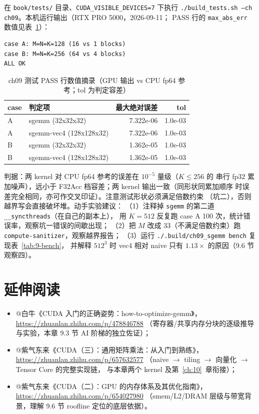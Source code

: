在 \texttt{book/tests/} 目录、\texttt{CUDA\_\allowbreak{}VISIBLE\_\allowbreak{}DEVICES=\allowbreak{}7} 下执行
\texttt{.\allowbreak{}/\allowbreak{}build\_\allowbreak{}tests.\allowbreak{}sh --ch ch09}。本机运行输出（RTX PRO 5000，2026-09-11；
PASS 行的 \texttt{max\_abs\_err} 数值见表~\ref{tab:9-pass}）：

\begin{lstlisting}[style=console]
case A: M=N=K=128 (16 vs 1 blocks)
case B: M=N=K=256 (64 vs 4 blocks)
ALL OK
\end{lstlisting}

\begin{table}[htbp]
\centering
\caption{ch09 测试 PASS 行数值摘录（GPU 输出 vs CPU fp64 参考；tol 为判定容差）}
\label{tab:9-pass}
\begin{tabular}{llrr}
\toprule
case & 判定项 & 最大绝对误差 & tol \\
\midrule
A & sgemm (32x32x32)      & 7.322e-06 & 1.0e-03 \\
A & sgemm-vec4 (128x128x32) & 7.322e-06 & 1.0e-03 \\
B & sgemm (32x32x32)      & 1.362e-05 & 1.0e-03 \\
B & sgemm-vec4 (128x128x32) & 1.362e-05 & 1.0e-03 \\
\bottomrule
\end{tabular}
\end{table}

判据：两 kernel 对 CPU fp64 参考的误差在 $10^{-5}$ 量级（$K \le 256$ 的
串行 fp32 累加噪声），远小于 F32Acc 档容差；两 kernel 输出一致（同形状同累加顺序
时误差完全相同，亦可作交叉印证）。注意测试形状必须满足倍数约束
（坑二），否则越界写会直接破坏堆。动手实验建议：
（1）注释掉 \texttt{sgemm} 的第二道 \texttt{\_\allowbreak{}\_\allowbreak{}syncthreads}（在自己的副本上），
用 $K = 512$ 反复跑 case A 100 次，统计错误率，观察坑一错误的间歇出现；
（2）把 $M$ 改成 33（不满足倍数约束）跑 \texttt{compute-sanitizer}，观察越界报告；
（3）运行 \texttt{.\allowbreak{}/\allowbreak{}.\allowbreak{}build/\allowbreak{}ch09\_\allowbreak{}sgemm bench} 复现表~\ref{tab:9-bench}，
并解释 $512^3$ 时 vec4 相对 naive 只有 $1.13\times$ 的原因（9.6 节观察四）。

\section*{延伸阅读}

\begin{itemize}
  \item @白牛《CUDA 入门的正确姿势：how-to-optimize-gemm》，
        \url{https://zhuanlan.zhihu.com/p/478846788}
        （寄存器/共享内存分块的逐级推导与实验，本章 9.3 节 AI 阶梯的独立佐证）；
  \item @紫气东来《CUDA（三）：通用矩阵乘法：从入门到熟练》，
        \url{https://zhuanlan.zhihu.com/p/657632577}
        （naive $\to$ tiling $\to$ 向量化 $\to$ Tensor Core 的完整实现链，
        与本章两个 kernel 及第~\ref{ch:10}~章衔接）；
  \item @紫气东来《CUDA（二）：GPU 的内存体系及其优化指南》，
        \url{https://zhuanlan.zhihu.com/p/654027980}
        （smem/L2/DRAM 层级与带宽背景，理解 9.6 节 roofline 定位的底层依据）。
\end{itemize}
